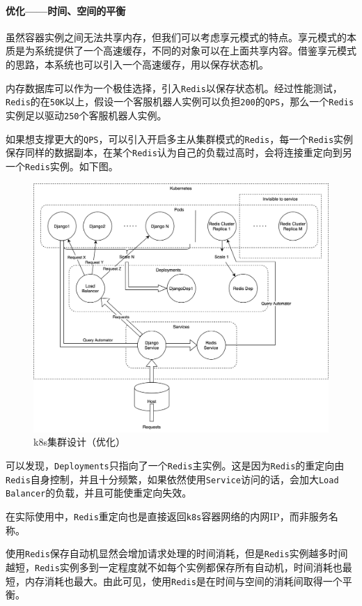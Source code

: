\documentclass[hyperref]{ctexart}
\begin{document}
\paragraph{优化——时间、空间的平衡}
虽然容器实例之间无法共享内存，但我们可以考虑享元模式的特点。享元模式的本质是为系统提供了一个高速缓存，不同的对象可以在上面共享内容。借鉴享元模式的思路，本系统也可以引入一个高速缓存，用以保存状态机。
\par 内存数据库可以作为一个极佳选择，引入\texttt{Redis}以保存状态机。经过性能测试，\texttt{Redis}的在\texttt{50K}以上，假设一个客服机器人实例可以负担\texttt{200}的\texttt{QPS}，那么一个\texttt{Redis}实例足以驱动\texttt{250}个客服机器人实例。
\par 如果想支撑更大的\texttt{QPS}，可以引入开启多主从集群模式的\texttt{Redis}，每一个\texttt{Redis}实例保存同样的数据副本，在某个\texttt{Redis}认为自己的负载过高时，会将连接重定向到另一个\texttt{Redis}实例。如下图。
\begin{figure}[H]
    \centering
    \includegraphics[scale=0.13]{figure/7.png}
    \caption{k8s集群设计（优化）}
    \label{Fig.1.7}
\end{figure}
\par 可以发现，\texttt{Deployments}只指向了一个\texttt{Redis}主实例。这是因为\texttt{Redis}的重定向由\texttt{Redis}自身控制，并且十分频繁，如果依然使用\texttt{Service}访问的话，会加大\texttt{Load Balancer}的负载，并且可能使重定向失效。
\par 在实际使用中，\texttt{Redis}重定向也是直接返回\texttt{k8s}容器网络的内网IP，而非服务名称。
\par 使用\texttt{Redis}保存自动机显然会增加请求处理的时间消耗，但是\texttt{Redis}实例越多时间越短，\texttt{Redis}实例多到一定程度就不如每个实例都保存所有自动机，时间消耗也最短，内存消耗也最大。由此可见，使用\texttt{Redis}是在时间与空间的消耗间取得一个平衡。
\end{document}

